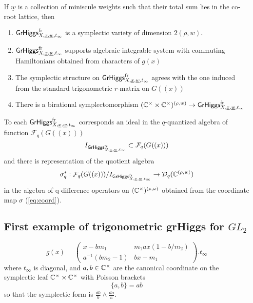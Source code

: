 \documentclass[12pt,psamsfonts,reqno]{amsart}
\begin{document}
 \begin{proposition}
   If $\underline{w}$ is a collection of miniscule weights such that their
   total sum lies in the co-root lattice, then 
   \begin{enumerate}
   \item $\mathsf{GrHiggs}_{X,\underline{x}, \underline{w},t_\infty}^{\mathrm{fr}}$ is a symplectic variety of dimension $2 (\rho, w)$.
   \item $\mathsf{GrHiggs}_{X,\underline{x}, \underline{w},t_\infty}^{\mathrm{fr}}$ supports
     algebraic integrable system with commuting Hamiltonians obtained
     from characters of $g(x)$
   \item The symplectic structure on $\mathsf{GrHiggs}_{X,\underline{x}, \underline{w},t_\infty}^{\mathrm{fr}}$ agrees with the one induced from the
     standard trigonometric $r$-matrix on $G((x))$ 
   \item There is a birational symplectomorphism $(\mathbb C^{\times} \times \mathbb C^{\times})^{(\rho,w)}
     \to \mathsf{GrHiggs}_{X,\underline{x}, \underline{w},t_\infty}^{\mathrm{fr}}$
   \end{enumerate}
 \item 
To each $\mathsf{GrHiggs}_{X,\underline{x}, \underline{w}, t_\infty}^{\mathrm{fr}}$
   corresponds an ideal in the $q$-quantized algebra of function $\mathcal{F}_q(G((x)))$
   \begin{equation}
     I_{\mathsf{GrHiggs}_{G,\underline{x}, \underline{w}, t_\infty}^{\mathrm{fr}}} \subset \mathcal{F}_q(G((x)))
   \end{equation}
   and there is representation  of the quotient algebra
   \begin{equation}
  \sigma_{q}^{*}:    \mathcal{F}_q(G((x)))/     I_{\mathsf{GrHiggs}_{X,\underline{x}, \underline{w}, t_\infty}^{\mathrm{fr}}} \to \mathcal{D}_{q}( \mathbb C^{(\rho, w)})
\end{equation}
in the algebra of q-difference operators on $(\mathbb C^\times)^{(\rho,\omega)}$ obtained from the coordinate map $\sigma$ (\ref{eq:coord}). 
 \end{proposition}
  


  
\subsection{First example of trigonometric grHiggs for $GL_2$}


\begin{equation}
g(x) =   \begin{pmatrix}
    x - b m_1 & m_1 a x (1 - b/m_2) \\
    a^{-1} (b m_2 - 1)  & b x - m_1 
  \end{pmatrix} . t_\infty
\end{equation}
where $t_\infty$ is diagonal, and $a, b \in \mathbb C^{\times}$ are the canonical coordinate on
the symplectic leaf $\mathbb C^{\times} \times \mathbb C^{\times}$ with Poisson brackets
\begin{equation}
  \{ a, b \} =  ab 
\end{equation}
so that the symplectic form is $\frac{db}{b} \wedge \frac {da}{a}$. 
\end{document}
